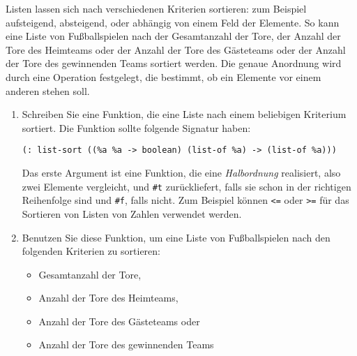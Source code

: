 \begin{aufgabe}
  Listen lassen sich nach verschiedenen Kriterien
  sortieren: zum Beispiel aufsteigend, absteigend, oder abhängig von
  einem Feld der Elemente.  So kann eine Liste von Fußballspielen nach
  der Gesamtanzahl der Tore, der Anzahl der Tore des Heimteams oder
  der Anzahl der Tore des Gästeteams oder der Anzahl der Tore des
  gewinnenden Teams sortiert werden.  Die genaue Anordnung wird durch
  eine Operation festgelegt, die bestimmt, ob ein Elemente vor einem anderen
  stehen soll.

\begin{enumerate}
\item Schreiben Sie eine Funktion, die eine Liste nach einem beliebigen
  Kriterium sortiert.  Die Funktion sollte folgende Signatur haben:

\begin{verbatim}
(: list-sort ((%a %a -> boolean) (list-of %a) -> (list-of %a)))
\end{verbatim}

  Das erste Argument ist eine Funktion, die eine \textit{Halbordnung}
  realisiert, also zwei Elemente vergleicht, und \verb|#t|
  zurückliefert, falls sie schon in der richtigen Reihenfolge sind und
  \verb|#f|, falls nicht.  Zum Beispiel können \verb|<=| oder \verb|>=|
  für das Sortieren von Listen von Zahlen verwendet werden.
\item Benutzen Sie diese Funktion, um eine Liste von
  Fußballspielen nach den folgenden Kriterien zu sortieren:
  \begin{itemize}
  \item Gesamtanzahl der Tore,
  \item Anzahl der Tore des Heimteams,
  \item Anzahl der Tore des Gästeteams oder
  \item Anzahl der Tore des
    gewinnenden Teams
  \end{itemize}
\end{enumerate}
\end{aufgabe}

